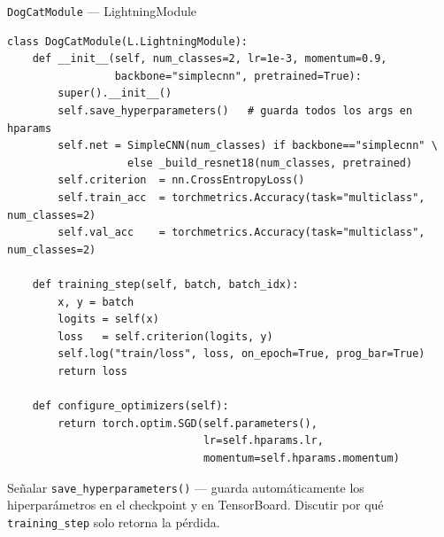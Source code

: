 \documentclass[aspectratio=169,10pt]{beamer}
\newcommand{\faLightbulb}{\ding{171}}
\newcommand{\teachernote}[1]{%
    \begin{tcolorbox}[
        colback=pyorange!20, colframe=pyorange!80!black,
        fonttitle=\bfseries\small, title={\faLightbulb\ Nota docente},
        left=4pt, right=4pt, top=2pt, bottom=2pt, sharp corners
    ]
    \scriptsize #1
    \end{tcolorbox}
}
\begin{document}
\begin{frame}[fragile]{\texttt{DogCatModule} --- LightningModule}
    \begin{lstlisting}[style=pythonstyle]
class DogCatModule(L.LightningModule):
    def __init__(self, num_classes=2, lr=1e-3, momentum=0.9,
                 backbone="simplecnn", pretrained=True):
        super().__init__()
        self.save_hyperparameters()   # guarda todos los args en hparams
        self.net = SimpleCNN(num_classes) if backbone=="simplecnn" \
                   else _build_resnet18(num_classes, pretrained)
        self.criterion  = nn.CrossEntropyLoss()
        self.train_acc  = torchmetrics.Accuracy(task="multiclass", num_classes=2)
        self.val_acc    = torchmetrics.Accuracy(task="multiclass", num_classes=2)

    def training_step(self, batch, batch_idx):
        x, y = batch
        logits = self(x)
        loss   = self.criterion(logits, y)
        self.log("train/loss", loss, on_epoch=True, prog_bar=True)
        return loss

    def configure_optimizers(self):
        return torch.optim.SGD(self.parameters(),
                               lr=self.hparams.lr,
                               momentum=self.hparams.momentum)
    \end{lstlisting}

    \vspace{-4pt}
    \teachernote{Señalar \texttt{save\_hyperparameters()} --- guarda automáticamente los hiperparámetros en el checkpoint y en TensorBoard. Discutir por qué \texttt{training\_step} solo retorna la pérdida.}
\end{frame}
\end{document}
